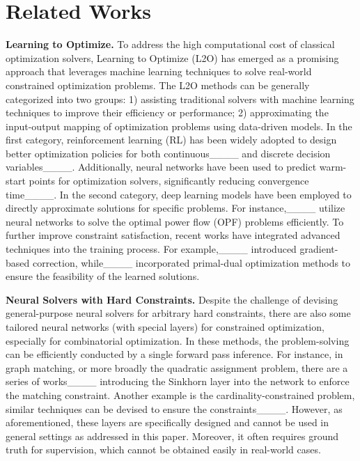 \section{Related Works}
\textbf{Learning to Optimize.} 
To address the high computational cost of classical optimization solvers, Learning to Optimize (L2O) has emerged as a promising approach that leverages machine learning techniques to solve real-world constrained optimization problems. The L2O methods can be generally categorized into two groups: 1) assisting traditional solvers with machine learning techniques to improve their efficiency or performance; 2) approximating the input-output mapping of optimization problems using data-driven models. In the first category, reinforcement learning (RL) has been widely adopted to design better optimization policies for both continuous____ and discrete decision variables____. Additionally, neural networks have been used to predict warm-start points for optimization solvers, significantly reducing convergence time____. 
In the second category, deep learning models have been employed to directly approximate solutions for specific problems. For instance,____ utilize neural networks to solve the optimal power flow (OPF) problems efficiently. To further improve constraint satisfaction, recent works have integrated advanced techniques into the training process. For example,____ introduced gradient-based correction, while____ incorporated primal-dual optimization methods to ensure the feasibility of the learned solutions.
  
  \textbf{Neural Solvers with Hard Constraints.} Despite the challenge of devising general-purpose neural solvers for arbitrary hard constraints, there are also some tailored neural networks (with special layers) for constrained optimization, especially for combinatorial optimization. In these methods, the problem-solving can be efficiently conducted by a single forward pass inference. For instance, in graph matching, or more broadly the quadratic assignment problem, there are a series of works____ introducing the Sinkhorn layer into the network to enforce the matching constraint. Another example is the cardinality-constrained problem, similar techniques can be devised to ensure the constraints____. However, as aforementioned, these layers are specifically designed and cannot be used in general settings as addressed in this paper. Moreover, it often requires ground truth for supervision, which cannot be obtained easily in real-world cases. 

